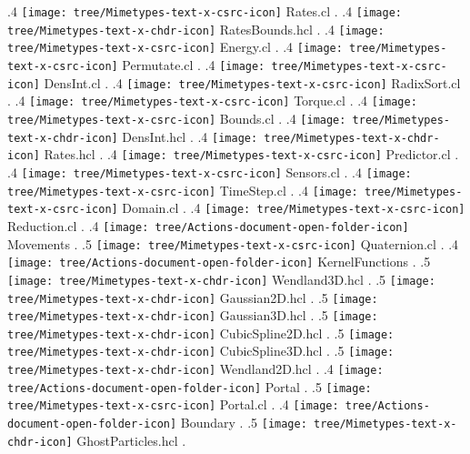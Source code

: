{.4 { \texttt{[image: tree/Mimetypes-text-x-csrc-icon]} Rates.cl }.
.4 { \texttt{[image: tree/Mimetypes-text-x-chdr-icon]} RatesBounds.hcl }.
.4 { \texttt{[image: tree/Mimetypes-text-x-csrc-icon]} Energy.cl }.
.4 { \texttt{[image: tree/Mimetypes-text-x-csrc-icon]} Permutate.cl }.
.4 { \texttt{[image: tree/Mimetypes-text-x-csrc-icon]} DensInt.cl }.
.4 { \texttt{[image: tree/Mimetypes-text-x-csrc-icon]} RadixSort.cl }.
.4 { \texttt{[image: tree/Mimetypes-text-x-csrc-icon]} Torque.cl }.
.4 { \texttt{[image: tree/Mimetypes-text-x-csrc-icon]} Bounds.cl }.
.4 { \texttt{[image: tree/Mimetypes-text-x-chdr-icon]} DensInt.hcl }.
.4 { \texttt{[image: tree/Mimetypes-text-x-chdr-icon]} Rates.hcl }.
.4 { \texttt{[image: tree/Mimetypes-text-x-csrc-icon]} Predictor.cl }.
.4 { \texttt{[image: tree/Mimetypes-text-x-csrc-icon]} Sensors.cl }.
.4 { \texttt{[image: tree/Mimetypes-text-x-csrc-icon]} TimeStep.cl }.
.4 { \texttt{[image: tree/Mimetypes-text-x-csrc-icon]} Domain.cl }.
.4 { \texttt{[image: tree/Mimetypes-text-x-csrc-icon]} Reduction.cl }.
.4 { \texttt{[image: tree/Actions-document-open-folder-icon]} Movements }.
.5 { \texttt{[image: tree/Mimetypes-text-x-csrc-icon]} Quaternion.cl }.
.4 { \texttt{[image: tree/Actions-document-open-folder-icon]} KernelFunctions }.
.5 { \texttt{[image: tree/Mimetypes-text-x-chdr-icon]} Wendland3D.hcl }.
.5 { \texttt{[image: tree/Mimetypes-text-x-chdr-icon]} Gaussian2D.hcl }.
.5 { \texttt{[image: tree/Mimetypes-text-x-chdr-icon]} Gaussian3D.hcl }.
.5 { \texttt{[image: tree/Mimetypes-text-x-chdr-icon]} CubicSpline2D.hcl }.
.5 { \texttt{[image: tree/Mimetypes-text-x-chdr-icon]} CubicSpline3D.hcl }.
.5 { \texttt{[image: tree/Mimetypes-text-x-chdr-icon]} Wendland2D.hcl }.
.4 { \texttt{[image: tree/Actions-document-open-folder-icon]} Portal }.
.5 { \texttt{[image: tree/Mimetypes-text-x-csrc-icon]} Portal.cl }.
.4 { \texttt{[image: tree/Actions-document-open-folder-icon]} Boundary }.
.5 { \texttt{[image: tree/Mimetypes-text-x-chdr-icon]} GhostParticles.hcl }.
}
